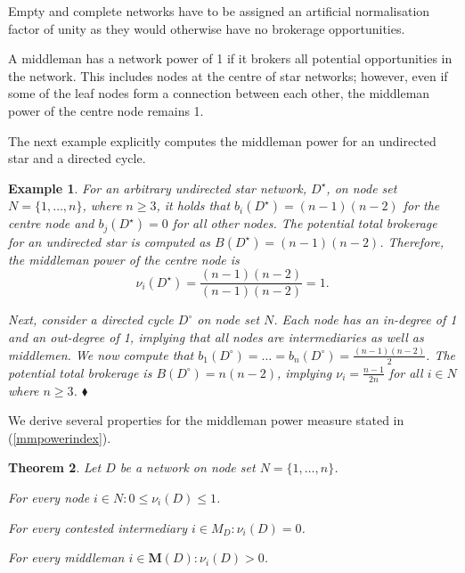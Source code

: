 \documentclass[11pt,fleqn]{article}
\newcounter{llst}
\newenvironment{abet}{\begin{list}{\rm (\alph{llst})}{\usecounter{llst}
\setlength{\itemindent}{0em} \setlength{\leftmargin}{3em}
\setlength{\labelwidth}{2em} \setlength{\labelsep}{1em}}}{\end{list}}
\newtheorem{theorem}{Theorem}[section]
\newtheorem{expl}[theorem]{Example}
\newenvironment{example}{\begin{expl} \rm}{\hfill $\blacklozenge$ \end{expl}}{}
\begin{document}
\noindent
Empty and complete networks have to be assigned an artificial normalisation factor of unity as they would otherwise have no brokerage opportunities.

A middleman has a network power of 1 if it brokers all potential opportunities in the network. This includes nodes at the centre of star networks; however, even if some of the leaf nodes form a connection between each other, the middleman power of the centre node remains 1.

The next example explicitly computes the middleman power for an undirected star and a directed cycle.

\begin{example} \label{starcycle}
For an arbitrary undirected star network, $D^{\star}$, on node set $N = \{ 1, \ldots ,n \}$, where $n \geqslant 3$, it holds that $b_{i}(D^{\star}) = (n-1)(n-2)$ for the centre node and $b_{j}(D^{\star})=0$ for all other nodes. The potential total brokerage for an undirected star is computed as $B(D^{\star}) = (n-1)(n-2)$. Therefore, the middleman power of the centre node is
\begin{equation}
\nu_{i}(D^{\star}) = \frac{(n-1)(n-2)}{(n-1)(n-2)} = 1 .
\end{equation}

\noindent Next, consider a directed cycle $D^{\circ}$ on node set $N$. Each node has an in-degree of 1 and an out-degree of 1, implying that all nodes are intermediaries as well as middlemen. We now compute that $b_{1}(D^{\circ}) = \ldots = b_{n}(D^{\circ}) = \frac{(n-1)(n-2)}{2}$. The potential total brokerage is $B (D^{\circ}) = n(n-2)$, implying $\nu_i = \frac{n-1}{2n}$ for all $i \in N$ where $n \geqslant 3$.
\end{example}

\noindent
We derive several properties for the middleman power measure stated in (\ref{mmpowerindex}).

\begin{theorem} \label{middlemanpowert}
Let $D$ be a network on node set $N=\{1, \ldots ,n\}$.
\begin{abet}
\item For every node $i \in N \colon 0 \leqslant \nu_{i} (D) \leqslant 1$.
\item For every contested intermediary $i \in M_D \colon \nu_{i}(D) = 0$.
\item For every middleman $i \in \mathbf M (D) \colon \nu_i (D) >0$.
\end{abet}
\end{theorem}
\end{document}
